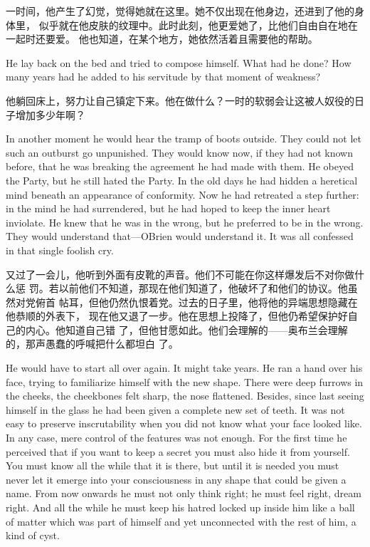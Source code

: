 \begin{paracol}{2}
\switchcolumn

一时间，他产生了幻觉，觉得她就在这里。她不仅出现在他身边，还进到了他的身体里，
似乎就在他皮肤的纹理中。此时此刻，他更爱她了，比他们自由自在地在一起时还要爱。
他也知道，在某个地方，她依然活着且需要他的帮助。

\switchcolumn*

He lay back on the bed and tried to compose himself. What had he done?
How many years had he added to his servitude by that moment of weakness?

\switchcolumn

他躺回床上，努力让自己镇定下来。他在做什么？一时的软弱会让这被人奴役的日子增加多少年啊？

\switchcolumn*

In another moment he would hear the tramp of boots outside. They could
not let such an outburst go unpunished. They would know now, if they had
not known before, that he was breaking the agreement he had made with
them. He obeyed the Party, but he still hated the Party. In the old days
he had hidden a heretical mind beneath an appearance of conformity. Now
he had retreated a step further: in the mind he had surrendered, but he
had hoped to keep the inner heart inviolate. He knew that he was in the
wrong, but he preferred to be in the wrong. They would understand
that---O\textquotesingle Brien would understand it. It was all confessed
in that single foolish cry.

\switchcolumn

又过了一会儿，他听到外面有皮靴的声音。他们不可能在你这样爆发后不对你做什么惩
罚。若以前他们不知道，那现在他们知道了，他破坏了和他们的协议。他虽然对党俯首
帖耳，但他仍然仇恨着党。过去的日子里，他将他的异端思想隐藏在他恭顺的外表下，
现在他又退了一步。他在思想上投降了，但他仍希望保护好自己的内心。他知道自己错
了，但他甘愿如此。他们会理解的——奥布兰会理解的，那声愚蠢的呼喊把什么都坦白
了。

\switchcolumn*

He would have to start all over again. It might take years. He ran a
hand over his face, trying to familiarize himself with the new shape.
There were deep furrows in the cheeks, the cheekbones felt sharp, the
nose flattened. Besides, since last seeing himself in the glass he had
been given a complete new set of teeth. It was not easy to preserve
inscrutability when you did not know what your face looked like. In any
case, mere control of the features was not enough. For the first time he
perceived that if you want to keep a secret you must also hide it from
yourself. You must know all the while that it is there, but until it is
needed you must never let it emerge into your consciousness in any shape
that could be given a name. From now onwards he must not only think
right; he must feel right, dream right. And all the while he must keep
his hatred locked up inside him like a ball of matter which was part of
himself and yet unconnected with the rest of him, a kind of cyst.


\end{paracol}
